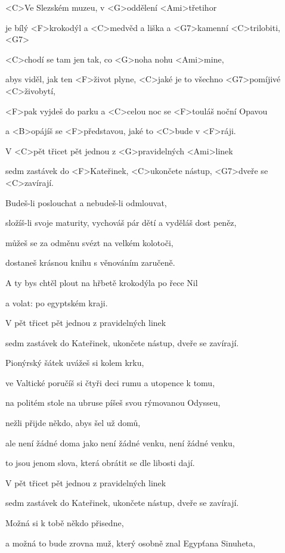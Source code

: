 

\zs
<C>Ve Slezském muzeu, v <G>oddělení <Ami>třetihor

je bílý <F>krokodýl a <C>medvěd a liška a <G7>kamenní <C>trilobiti, <G7>

<C>chodí se tam jen tak, co <G>noha nohu <Ami>mine,

abys viděl, jak ten <F>život plyne, <C>jaké je to všechno <G7>pomíjivé <C>živobytí,

<F>pak vyjdeš do parku a <C>celou noc se <F>touláš noční Opavou

a <B>opájíš se <F>představou, jaké to <C>bude v <F>ráji.

V <C>pět třicet pět jednou z <G>pravidelných <Ami>linek

sedm zastávek do <F>Kateřinek, <C>ukončete nástup, <G7>dveře se <C>zavírají.
\ks

\zs
Budeš-li poslouchat a nebudeš-li odmlouvat,

složíš-li svoje maturity, vychováš pár dětí a vyděláš dost peněz,

můžeš se za odměnu svézt na velkém kolotoči,

dostaneš krásnou knihu s věnováním zaručeně.

A ty bys chtěl plout na hřbetě krokodýla po řece Nil

a volat:  po egyptském kraji.

V pět třicet pět jednou z pravidelných linek

sedm zastávek do Kateřinek, ukončete nástup, dveře se zavírají.
\ks

\zs
Pionýrský šátek uvážeš si kolem krku,

ve Valtické poručíš si čtyři deci rumu a utopence k tomu,

na politém stole na ubruse píšeš svou rýmovanou Odysseu,

nežli přijde někdo, abys šel už domů,

ale není žádné doma jako není žádné venku, není žádné venku,

to jsou jenom slova, která obrátit se dle libosti dají.

V pět třicet pět jednou z pravidelných linek

sedm zastávek do Kateřinek, ukončete nástup, dveře se zavírají.
\ks

\zs
Možná si k tobě někdo přisedne,

a možná to bude zrovna muž, který osobně znal Egypťana Sinuheta,

